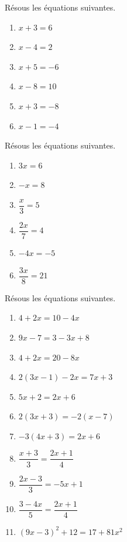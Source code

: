 \documentclass[../math2.tex]{subfiles}
\begin{document}
\begin{exercise}
  Résous les équations suivantes.
  \begin{enumerate}[cols=2]
    \item $x + 3 = 6$
    \item $x - 4 = 2$
    \item $x + 5 =  - 6$
    \item $x - 8 = 10$
    \item $x + 3 =  - 8$
    \item $x - 1 =  - 4$
  \end{enumerate}
\end{exercise}

\begin{exercise}
  Résous les équations suivantes.
  \begin{enumerate}[cols=2]
    \item $3x = 6$
    \item $- x = 8$
    \item $\dfrac{x}{3} = 5$
    \item $\dfrac{2x}{7} = 4$
    \item $- 4x = - 5$
    \item $\dfrac{3x}{8} = 21$
  \end{enumerate}
\end{exercise}

\begin{exercise}
  Résous les équations suivantes.
  \begin{enumerate}[cols=2]
    \item $4 + 2x = 10 - 4x$
    \item $9x - 7 = 3 - 3x + 8$
    \item $4 + 2x = 20 - 8x$
    \item $2(3x - 1) - 2x = 7x + 3$
    \item $5x + 2 = 2x + 6$
    \item $2(3x + 3) = - 2(x - 7)$
    \item $- 3(4x + 3) = 2x + 6$
    \item $\dfrac{x + 3}{3} = \dfrac{2x + 1}{4}$
    \item $\dfrac{2x - 3}{3} =  - 5x + 1$
    \item $\dfrac{3 - 4x}{5} = \dfrac{2x + 1}{4}$
    \item $(9x - 3)^{2} + 12 = 17 + 81x^2$
  \end{enumerate}
\end{exercise}
\end{document}
